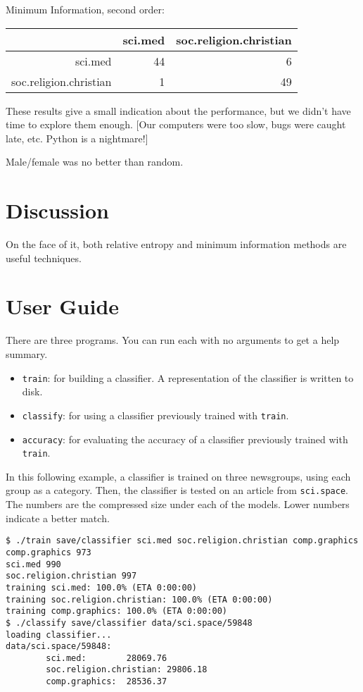 \documentclass[a4]{article}
\begin{document}
Minimum Information, second order:
\begin{center}
\begin{tabular}{|r|r|r|} \hline
			& sci.med & soc.religion.christian \\ \hline
sci.med			& 44      & 6 \\ \hline
soc.religion.christian	& 1	  & 49 \\ \hline
\end{tabular}
\end{center}

These results give a small indication about the performance, but we didn't
have time to explore them enough.  [Our computers were too slow, bugs
were caught late, etc.  Python is a nightmare!]

Male/female was no better than random.

\section{Discussion}
On the face of it, both relative entropy and minimum information methods
are useful techniques.

\section{User Guide}
There are three programs.  You can run each with no arguments to get a
help summary.
\begin{itemize}
\item \texttt{train}: for building a classifier.  A representation of the
classifier is written to disk.

\item \texttt{classify}: for using a classifier previously trained with
\texttt{train}.

\item \texttt{accuracy}: for evaluating the accuracy of a classifier
previously trained with \texttt{train}.
\end{itemize}

In this following example, a classifier is trained on three newsgroups, using
each group as a category.  Then, the classifier is tested on an article from
\texttt{sci.space}.  The numbers are the compressed size under each of the
models.  Lower numbers indicate a better match.

\begin{verbatim}
$ ./train save/classifier sci.med soc.religion.christian comp.graphics
comp.graphics 973
sci.med 990
soc.religion.christian 997
training sci.med: 100.0% (ETA 0:00:00)
training soc.religion.christian: 100.0% (ETA 0:00:00)
training comp.graphics: 100.0% (ETA 0:00:00)
$ ./classify save/classifier data/sci.space/59848
loading classifier...
data/sci.space/59848:
        sci.med:        28069.76
        soc.religion.christian: 29806.18
        comp.graphics:  28536.37
\end{verbatim}
\end{document}
